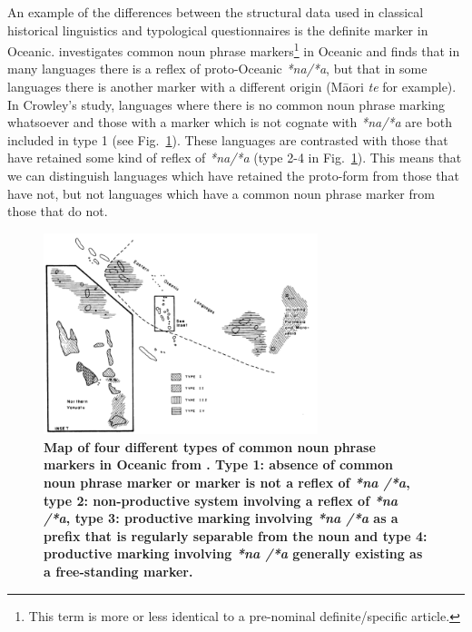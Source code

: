 \documentclass[draft,10pt]{article} %
\begin{document}
An example of the differences between the structural data used in classical historical linguistics and typological questionnaires is the definite marker in Oceanic. \citet{crowley1985common} investigates common noun phrase markers\footnote{This term is more or less identical to a pre-nominal definite/specific article.} in Oceanic and finds that in many languages there is a reflex of proto-Oceanic \emph{*na/*a}, but that in some languages there is another marker with a different origin (M\={a}ori \emph{te} for example). In Crowley's study, languages where there is no common noun phrase marking whatsoever and those with a marker which is not cognate with \emph{*na/*a} are both included in type 1 (see Fig.~\ref{fig:crowley_map}). These languages are contrasted with those that have retained some kind of reflex of \emph{*na/*a} (type 2-4 in Fig.~\ref{fig:crowley_map}). This means that we can distinguish languages which have retained the proto-form from those that have not, but not languages which have a common noun phrase marker from those that do not.

\begin{figure}
\centering
\includegraphics[width=8cm]{illustrations/crowley_1985_map.png}
\caption[Map of four different types of common noun phrase markers in Oceanic from Crowley(1985).]{\textbf{Map of four different types of common noun phrase markers in Oceanic from \citet[162]{crowley1985common}. Type 1: absence of common noun phrase marker or marker is not a reflex of \emph{*na /*a}, type 2: non-productive system involving a reflex of \emph{*na /*a}, type 3: productive marking involving \emph{*na /*a} as a prefix that is regularly separable from the noun and type 4: productive marking involving \emph{*na /*a} generally existing as a free-standing marker.}}
\label{fig:crowley_map}
\end{figure}
\end{document}
